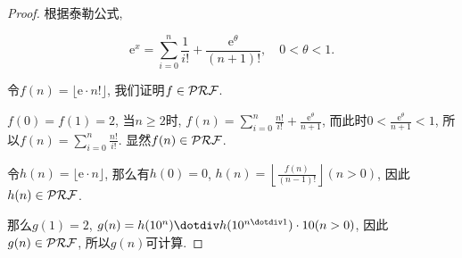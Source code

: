 \begin{proof}
根据泰勒公式, 

$$\mathrm{e}^x=\sum_{i=0}^n\frac{1}{i!}+\frac{\mathrm{e}^\theta}{(n+1)!},\quad 0<\theta<1.$$

令$f(n)=\lfloor \mathrm{e}\cdot n!\rfloor$, 我们证明$f\in\mathcal{PRF}$.

$f(0)=f(1)=2$, 当$n\geqslant 2$时, $f(n)=\sum_{i=0}^n\frac{n!}{i!}+\frac{\mathrm{e}^\theta}{n+1}$, 而此时$0<\frac{\mathrm{e}^\theta}{n+1}<1$, 所以$f(n)=\sum_{i=0}^n\frac{n!}{i!}$. 显然$f(n)\in\mathcal{PRF}$.

令$h(n)=\lfloor \mathrm{e}\cdot n\rfloor$, 那么有$h(0)=0$, $h(n)=\left\lfloor\frac{f(n)}{(n-1)!}\right\rfloor(n>0)$, 因此$h(n)\in\mathcal{PRF}$.

那么$g(1)=2$, $g(n)=h(10^n)\dotdiv h(10^{n\dotdiv 1})\cdot 10(n>0)$, 因此$g(n)\in\mathcal{PRF}$, 所以$g(n)$可计算.
\end{proof}